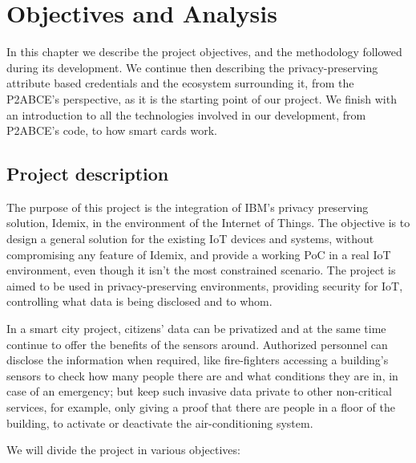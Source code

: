 \chapter{Objectives and Analysis}\label{ch:objectives}

In this chapter we describe the project objectives, and the methodology followed during its development. We continue then describing the privacy-preserving attribute based credentials and the ecosystem surrounding it, from the P2ABCE's perspective, as it is the starting point of our project. We finish with an introduction to all the technologies involved in our development, from P2ABCE's code, to how smart cards work.

\section{Project description}\label{objectives:section}

The purpose of this project is the integration of IBM's privacy preserving solution, Idemix, in the environment of the Internet of Things. The objective is to design a general solution for the existing IoT devices and systems, without compromising any feature of Idemix, and provide a working PoC in a real IoT environment, even though it isn't the most constrained scenario. The project is aimed to be used in privacy-preserving environments, providing security for IoT, controlling what data is being disclosed and to whom.

In a smart city project, citizens' data can be privatized and at the same time continue to offer the benefits of the sensors around. Authorized personnel can disclose the information when required, like fire-fighters accessing a building's sensors to check how many people there are and what conditions they are in, in case of an emergency; but keep such invasive data private to other non-critical services, for example, only giving a proof that there are people in a floor of the building, to activate or deactivate the air-conditioning system.

\hfil


We will divide the project in various objectives:


